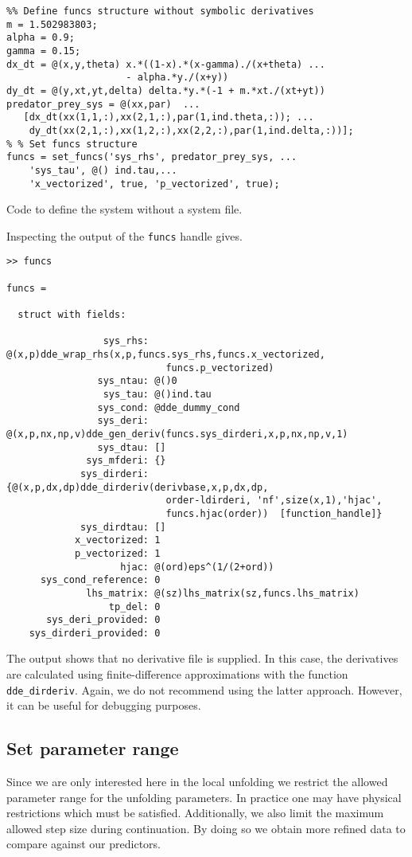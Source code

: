 \begin{listing}[H]
\begin{verbatim}
%% Define funcs structure without symbolic derivatives
m = 1.502983803;
alpha = 0.9;
gamma = 0.15;
dx_dt = @(x,y,theta) x.*((1-x).*(x-gamma)./(x+theta) ...
                     - alpha.*y./(x+y))
dy_dt = @(y,xt,yt,delta) delta.*y.*(-1 + m.*xt./(xt+yt))
predator_prey_sys = @(xx,par)  ...
   [dx_dt(xx(1,1,:),xx(2,1,:),par(1,ind.theta,:)); ...
    dy_dt(xx(2,1,:),xx(1,2,:),xx(2,2,:),par(1,ind.delta,:))];
% % Set funcs structure
funcs = set_funcs('sys_rhs', predator_prey_sys, ...
    'sys_tau', @() ind.tau,...
    'x_vectorized', true, 'p_vectorized', true);
\end{verbatim}
\caption{Code to define the system without a system file.}
\label{sm:lst:wo_system_file}
\end{listing}
Inspecting the output of the \texttt{funcs} handle gives.
\begin{verbatim}
>> funcs

funcs =

  struct with fields:

                 sys_rhs: @(x,p)dde_wrap_rhs(x,p,funcs.sys_rhs,funcs.x_vectorized,
                            funcs.p_vectorized)
                sys_ntau: @()0
                 sys_tau: @()ind.tau
                sys_cond: @dde_dummy_cond
                sys_deri: @(x,p,nx,np,v)dde_gen_deriv(funcs.sys_dirderi,x,p,nx,np,v,1)
                sys_dtau: []
              sys_mfderi: {}
             sys_dirderi: {@(x,p,dx,dp)dde_dirderiv(derivbase,x,p,dx,dp,
                            order-ldirderi, 'nf',size(x,1),'hjac',
                            funcs.hjac(order))  [function_handle]}
             sys_dirdtau: []
            x_vectorized: 1
            p_vectorized: 1
                    hjac: @(ord)eps^(1/(2+ord))
      sys_cond_reference: 0
              lhs_matrix: @(sz)lhs_matrix(sz,funcs.lhs_matrix)
                  tp_del: 0
       sys_deri_provided: 0
    sys_dirderi_provided: 0
\end{verbatim}
The output shows that no derivative file is supplied. In this case, the
derivatives are calculated using finite-difference approximations with the
function \texttt{dde_dirderiv}. Again, we do not recommend using the latter
approach. However, it can be useful for debugging purposes.

\subsection{Set parameter range}
Since we are only interested here in the local unfolding we restrict the
allowed parameter range for the unfolding parameters. In practice one may have
physical restrictions which must be satisfied. Additionally, we also limit the
maximum allowed step size during continuation. By doing so we obtain more refined
data to compare against our predictors.
\inputminted[firstline=37, lastline=40]{MATLAB}{\pathToDDEBifToolDemos/predator_prey/predator_prey.m}


